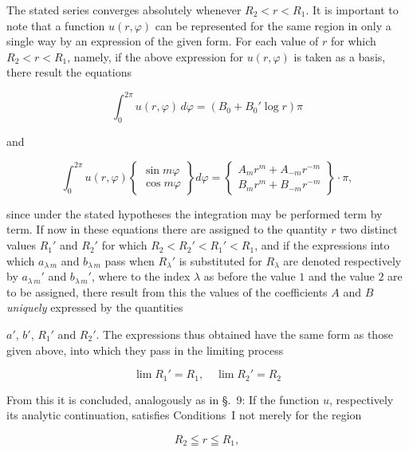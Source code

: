 \documentclass{article}
\begin{document}
The stated series converges absolutely whenever $R_2 < r < R_1$. It is important to note that a function $u(r, \varphi)$ can be represented for the same region in only a single way by an expression of the given form. For each value of $r$ for which $R_2 < r < R_1$, namely, if the above expression for $u(r, \varphi)$ is taken as a basis, there result the equations

\[

\int_0^{2\pi} u(r, \varphi) \, d\varphi = (B_0 + B_0' \log r) \pi

\]

and

\[

\int_0^{2\pi} u(r, \varphi) \left\{ \begin{array}{c} \sin m\varphi \\ \cos m\varphi \end{array} \right\} d\varphi = \left\{ \begin{array}{c} A_m r^m + A_{-m} r^{-m} \\ B_m r^m + B_{-m} r^{-m} \end{array} \right\} \cdot \pi,

\]

since under the stated hypotheses the integration may be performed term by term. If now in these equations there are assigned to the quantity $r$ two distinct values $R_1'$ and $R_2'$ for which $R_2 < R_2' < R_1' < R_1$, and if the expressions into which $a_{\lambda\,m}$ and $b_{\lambda\,m}$ pass when $R_\lambda'$ is substituted for $R_\lambda$ are denoted respectively by $a_{\lambda\,m}'$ and $b_{\lambda\,m}'$, where to the index $\lambda$ as before the value $1$ and the value $2$ are to be assigned, there result from this the values of the coefficients $A$ and $B$ \emph{uniquely} expressed by the quantities




$a'$, $b'$, $R_1'$ and $R_2'$. The expressions thus obtained have the same form as those given above, into which they pass in the limiting process

\[

\lim R_1' = R_1, \quad \lim R_2' = R_2

\]



From this it is concluded, analogously as in §.~9: If the function $u$, respectively its analytic continuation, satisfies Conditions~I not merely for the region

\[

R_2 \leqq r \leqq R_1,

\]
\end{document}
